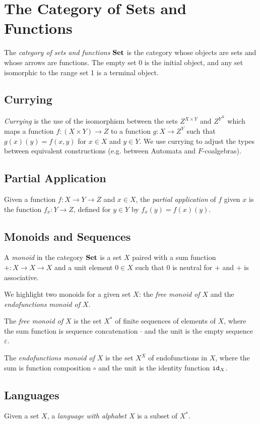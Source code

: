 \section{The Category of Sets and Functions}
The \emph{category of sets and functions} $\AsCategory{Set}$ is the category whose objects are sets and whose arrows are functions. The empty set $0$ is the initial object, and any set isomorphic to the range set 1 is a terminal object.

\subsection{Currying}
\emph{Currying} is the use of the isomorphism between the sets $Z^{X\times Y}$ and $Z^{Y^X}$ which maps a function $f\colon (X\times Y)\rightarrow Z$ to a function $g\colon X\rightarrow Z^Y$ such that $g(x)(y)=f(x,y)$ for $x\in X$ and $y\in Y$. We use currying to adjust the types between equivalent constructions (e.g. between Automata and $F$-coalgebras).

\subsection{Partial Application}
Given a function $f\colon X\rightarrow Y \rightarrow Z$ and $x\in X$, the \emph{partial application} of $f$ given $x$ is the function $f_x\colon Y \rightarrow Z$, defined for $y\in Y$ by $f_x(y)=f(x)(y)$.

\subsection{Monoids and Sequences} 
A \emph{monoid} in the category $\AsCategory{Set}$ is a set $X$ paired with a sum function $+\colon X\rightarrow X\rightarrow X$ and a unit element $0\in X$ such that $0$ is neutral for $+$ and $+$ is associative. 

We highlight two monoids for a given set $X$: the \emph{free monoid of $X$} and the \emph{endofunctions monoid of $X$}.

The \emph{free monoid of $X$} is the set $X^*$ of finite sequences of elements of $X$, where the sum function is sequence concatenation $\cdot$ and the unit is the empty sequence $\varepsilon$.

The \emph{endofunctions monoid of $X$} is the set $X^X$ of endofunctions in $X$, where the sum is function composition $\circ$ and the unit is the identity function ${\texttt{id}}_X$.

\subsection{Languages}
Given a set $X$, a \emph{language with alphabet $X$} is a subset of $X^*$. 

